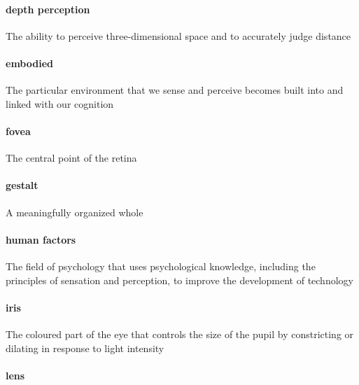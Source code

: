 \documentclass[
]{krantz}
\begin{document}
\paragraph*{depth perception}\label{depth-perception}

The ability to perceive three-dimensional space and to accurately judge distance

\paragraph*{embodied}\label{embodied}

The particular environment that we sense and perceive becomes built into and linked with our cognition

\paragraph*{fovea}\label{fovea}

The central point of the retina

\paragraph*{gestalt}\label{gestalt}

A meaningfully organized whole

\paragraph*{human factors}\label{human-factors}

The field of psychology that uses psychological knowledge, including the principles of sensation and perception, to improve the development of technology

\paragraph*{iris}\label{iris}

The coloured part of the eye that controls the size of the pupil by constricting or dilating in response to light intensity

\paragraph*{lens}\label{lens}
\end{document}

